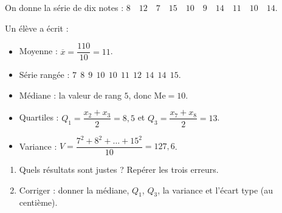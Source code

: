 
\newcommand{\R}{\mathbb{R}}
\newcommand{\vect}[1]{\overrightarrow{#1}}

On donne la série de dix notes : \quad $8\quad12\quad7\quad15\quad10\quad9\quad14\quad11\quad10\quad14$.

Un élève a écrit :
\begin{itemize}
  \item Moyenne : $\overline x=\dfrac{110}{10}=11$.
  \item Série rangée : $7\ \ 8\ \ 9\ \ 10\ \ 10\ \ 11\ \ 12\ \ 14\ \ 14\ \ 15$.
  \item Médiane : la valeur de rang $5$, donc $\text{Me}=10$.
  \item Quartiles : $Q_1=\dfrac{x_2+x_3}{2}=8{,}5$ et $Q_3=\dfrac{x_7+x_8}{2}=13$.
  \item Variance : $V=\dfrac{7^2+8^2+\dots+15^2}{10}=127{,}6$.
\end{itemize}
\begin{enumerate}
  \item Quels résultats sont justes ? Repérer les trois erreurs.
  \item Corriger : donner la médiane, $Q_1$, $Q_3$, la variance et l'écart type (au centième).
\end{enumerate}

